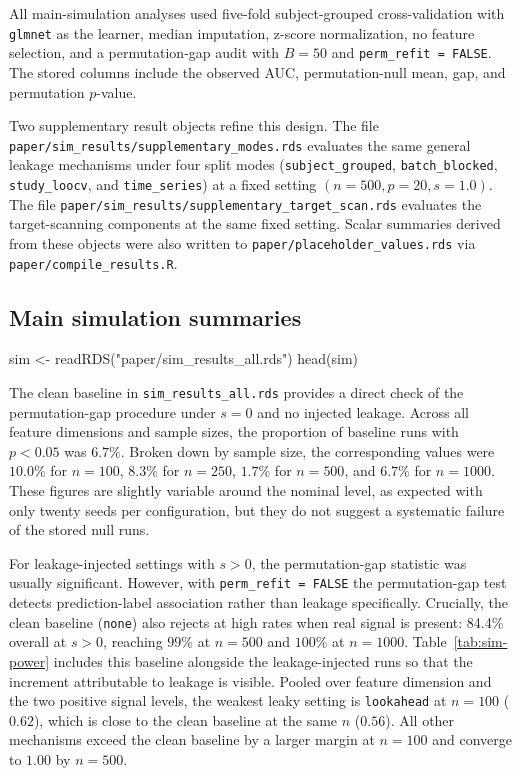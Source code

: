 \documentclass[article]{jss}
\begin{document}
All main-simulation analyses used five-fold subject-grouped cross-validation
with \texttt{glmnet} as the learner, median imputation, z-score normalization,
no feature selection, and a permutation-gap audit with $B = 50$ and
\texttt{perm\_refit = FALSE}. The stored columns include the observed AUC,
permutation-null mean, gap, and permutation $p$-value.

Two supplementary result objects refine this design. The file
\texttt{paper/sim\_results/supplementary\_modes.rds} evaluates the same general
leakage mechanisms under four split modes
(\texttt{subject\_grouped}, \texttt{batch\_blocked}, \texttt{study\_loocv}, and
\texttt{time\_series}) at a fixed setting $(n = 500, p = 20, s = 1.0)$. The
file \texttt{paper/sim\_results/supplementary\_target\_scan.rds} evaluates the
target-scanning components at the same fixed setting. Scalar summaries derived
from these objects were also written to \texttt{paper/placeholder\_values.rds}
via \texttt{paper/compile\_results.R}.

\subsection{Main simulation summaries}

\begin{CodeInput}
sim <- readRDS("paper/sim_results_all.rds")
head(sim)
\end{CodeInput}


The clean baseline in \texttt{sim\_results\_all.rds} provides a direct check of
the permutation-gap procedure under $s = 0$ and no injected leakage. Across all
feature dimensions and sample sizes, the proportion of baseline runs with
$p < 0.05$ was $6.7\%$. Broken down by sample size, the corresponding values
were $10.0\%$ for $n = 100$, $8.3\%$ for $n = 250$, $1.7\%$ for $n = 500$, and
$6.7\%$ for $n = 1000$. These figures are slightly variable around the nominal
level, as expected with only twenty seeds per configuration, but they do not
suggest a systematic failure of the stored null runs.

For leakage-injected settings with $s > 0$, the permutation-gap statistic was
usually significant. However, with \texttt{perm\_refit = FALSE} the
permutation-gap test detects prediction-label association rather than leakage
specifically. Crucially, the clean baseline (\texttt{none}) also rejects at
high rates when real signal is present: 84.4\% overall at $s > 0$,
reaching $99\%$ at $n = 500$ and $100\%$ at $n = 1000$.
Table~\ref{tab:sim-power} includes this baseline alongside the leakage-injected
runs so that the increment attributable to leakage is visible. Pooled over
feature dimension and the two positive signal levels, the weakest leaky setting
is \texttt{lookahead} at $n = 100$ ($0.62$), which is close to the clean
baseline at the same $n$ ($0.56$). All other mechanisms exceed the clean
baseline by a larger margin at $n = 100$ and converge to $1.00$ by $n = 500$.
\end{document}
